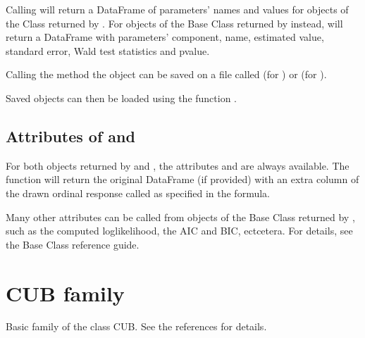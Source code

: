 \documentclass[letterpaper,10pt,english]{sphinxmanual}
\begin{document}
\sphinxAtStartPar
Calling  will return a DataFrame of parameters’ names and values for objects
of the Class  returned by . For objects of the Base Class  returned
by  instead, will return a DataFrame with parameters’ component, name, estimated value,
standard error, Wald test statistics and p\sphinxhyphen{}value.

\sphinxAtStartPar
Calling the method  the object can be saved on a file called 
(for ) or  (for ).

\sphinxAtStartPar
Saved objects can then be loaded using the function .


\subsection{Attributes of  and }
\label{\detokenize{manual:attributes-of-estimate-and-draw}}
\sphinxAtStartPar
For both objects returned by  and , the attributes  and
 are always available. The function  will return the original DataFrame (if provided)
with an extra column of the drawn ordinal response called as specified in the formula.

\sphinxAtStartPar
Many other attributes can be called from objects of the Base Class  returned by
, such as the computed loglikelihood, the AIC and BIC, ectcetera. For details,
see the Base Class  reference guide.


\section{CUB family}
\label{\detokenize{manual:cub-family}}
\sphinxAtStartPar
Basic family of the class CUB. See the references for details.
\end{document}
